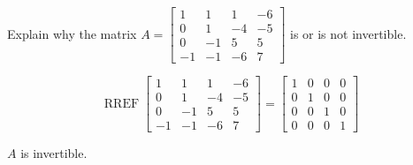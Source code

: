 
\begin{exerciseStatement}


Explain why the matrix \(A= \left[\begin{array}{cccc}
1 & 1 & 1 & -6 \\
0 & 1 & -4 & -5 \\
0 & -1 & 5 & 5 \\
-1 & -1 & -6 & 7
\end{array}\right] \) is or is not invertible.


\end{exerciseStatement}
    
\begin{exerciseAnswer} 


\[\operatorname{RREF} \left[\begin{array}{cccc}
1 & 1 & 1 & -6 \\
0 & 1 & -4 & -5 \\
0 & -1 & 5 & 5 \\
-1 & -1 & -6 & 7
\end{array}\right] = \left[\begin{array}{cccc}
1 & 0 & 0 & 0 \\
0 & 1 & 0 & 0 \\
0 & 0 & 1 & 0 \\
0 & 0 & 0 & 1
\end{array}\right] \]

\(A\) is invertible.
\end{exerciseAnswer}
    
